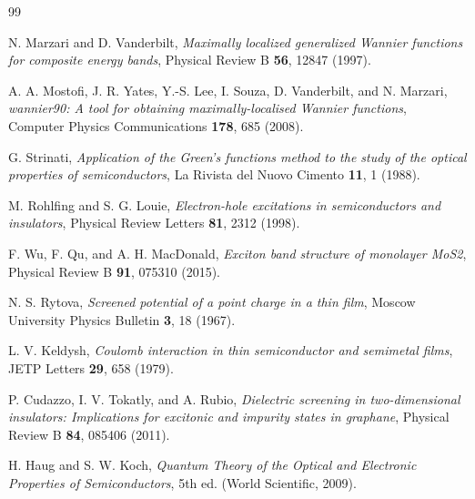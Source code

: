\documentclass[12pt,a4paper]{article}
\begin{document}
\begin{thebibliography}{99}

N. Marzari and D. Vanderbilt, \textit{Maximally localized generalized Wannier functions for composite energy bands}, Physical Review B \textbf{56}, 12847 (1997).

A. A. Mostofi, J. R. Yates, Y.-S. Lee, I. Souza, D. Vanderbilt, and N. Marzari, \textit{wannier90: A tool for obtaining maximally-localised Wannier functions}, Computer Physics Communications \textbf{178}, 685 (2008).

G. Strinati, \textit{Application of the Green’s functions method to the study of the optical properties of semiconductors}, La Rivista del Nuovo Cimento \textbf{11}, 1 (1988).

M. Rohlfing and S. G. Louie, \textit{Electron-hole excitations in semiconductors and insulators}, Physical Review Letters \textbf{81}, 2312 (1998).

F. Wu, F. Qu, and A. H. MacDonald, \textit{Exciton band structure of monolayer MoS2}, Physical Review B \textbf{91}, 075310 (2015).

N. S. Rytova, \textit{Screened potential of a point charge in a thin film}, Moscow University Physics Bulletin \textbf{3}, 18 (1967).

L. V. Keldysh, \textit{Coulomb interaction in thin semiconductor and semimetal films}, JETP Letters \textbf{29}, 658 (1979).

P. Cudazzo, I. V. Tokatly, and A. Rubio, \textit{Dielectric screening in two-dimensional insulators: Implications for excitonic and impurity states in graphane}, Physical Review B \textbf{84}, 085406 (2011).

H. Haug and S. W. Koch, \textit{Quantum Theory of the Optical and Electronic Properties of Semiconductors}, 5th ed. (World Scientific, 2009).

\end{thebibliography}
\end{document}
